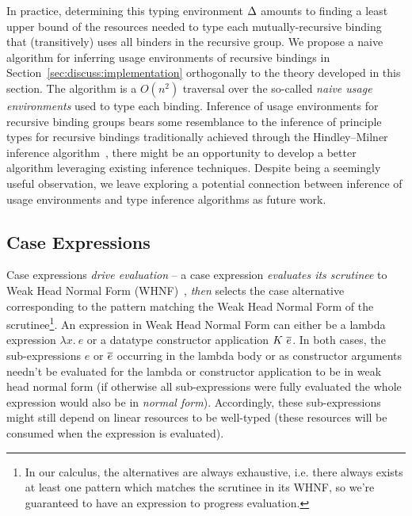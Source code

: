 \documentclass[acmsmall,review]{acmart}
\begin{document}
In practice, determining this typing environment $\Delta$ amounts to finding a
least upper bound of the resources needed to type each mutually-recursive
binding that (transitively) uses all binders in the recursive group.
%
We propose a naive algorithm for inferring usage environments of recursive
bindings in Section~\ref{sec:discuss:implementation} orthogonally to the theory
developed in this section.
%
The algorithm is a $O(n^2)$ traversal over the so-called \emph{naive usage
environments} used to type each binding.
%
Inference of usage environments for recursive binding groups bears some
resemblance to the inference of principle types for recursive bindings
traditionally achieved through the Hindley–Milner inference
algorithm~\cite{DBLP:conf/popl/DamasM82}, there might be an opportunity to
develop a better algorithm leveraging existing inference techniques.
%
Despite being a seemingly useful observation, we leave exploring a potential
connection between inference of usage environments and type inference
algorithms as future work.


\subsection{Case Expressions\label{sec:lc-case-exps}}

Case expressions \emph{drive evaluation} --
%
%
%
a case expression \emph{evaluates its scrutinee} to Weak Head Normal Form
(WHNF)~\cite{10.5555/1096899}, \emph{then} selects the case alternative corresponding to the pattern
matching the Weak Head Normal Form of the scrutinee\footnote{In our calculus,
the alternatives are always exhaustive, i.e. there always exists at least one
pattern which matches the scrutinee in its WHNF, so we're guaranteed to have an
expression to progress evaluation.}. An expression in Weak Head Normal Form can
either be %
a lambda expression $\lambda x.~e$ 
or a datatype constructor application $K~\overline{e}$.
In both cases, the sub-expressions $e$ or $\overline{e}$ occurring in the lambda body
or as constructor arguments needn't be evaluated for the lambda or constructor
application to be in weak head normal form (if otherwise all sub-expressions
were fully evaluated the whole expression would also be in \emph{normal form}).
%
Accordingly, these sub-expressions might still depend on linear resources to be
well-typed (these resources will be consumed when the expression is evaluated).
\end{document}
